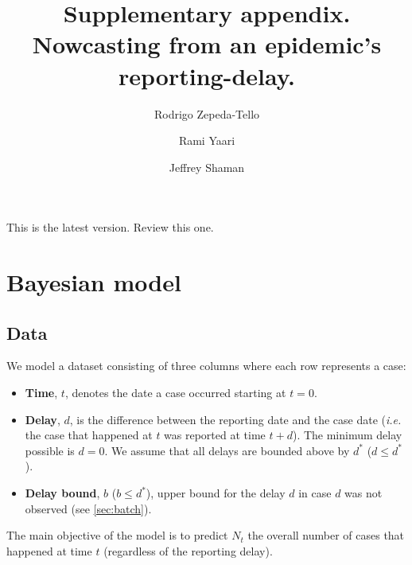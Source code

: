 \documentclass{article}
\title{Supplementary appendix. Nowcasting from an epidemic's reporting-delay.}
\author{Rodrigo Zepeda-Tello \and Rami Yaari \and Jeffrey Shaman}
\begin{document}
  
\maketitle

{\color{blue} \Large This is the latest version. Review this one.}


\section{Bayesian model}
\subsection{Data}
We model a dataset consisting of three columns where each row represents a case:
\begin{itemize}
    \item \textbf{Time}, $t$, denotes the date a case occurred starting at $t = 0$. 
    \item \textbf{Delay}, $d$, is the difference between the reporting date and the case date (\textit{i.e.} the case that happened at $t$ was reported at time $t + d$). The minimum delay possible is $d = 0$. We assume that all delays are bounded above by $d^*$ ($d \leq d^*$).  
    \item \textbf{Delay bound}, $b$ ($b \leq d^*$), upper bound for the delay $d$ in case $d$ was not observed (see \ref{sec:batch}).   
\end{itemize}
The main objective of the model is to predict $N_t$ the overall number of cases that happened at time $t$ (regardless of the reporting delay). 
\end{document}
